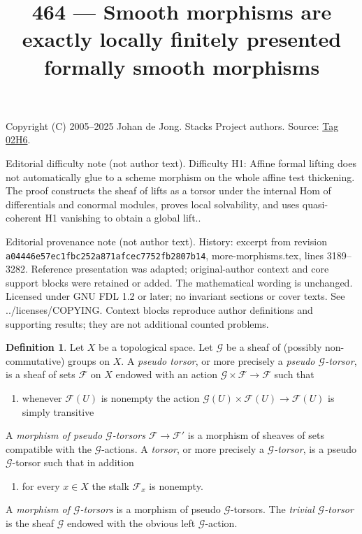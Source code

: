 \documentclass{amsart}
\theoremstyle{plain}
\theoremstyle{definition}
\newtheorem{definition}[subsection]{Definition}
\theoremstyle{remark}
\numberwithin{equation}{subsection}
\begin{document}
\title[Stacks Project, Tag 02H6]{464 --- Smooth morphisms are exactly locally finitely presented formally smooth morphisms}
\maketitle
\noindent Copyright (C) 2005--2025 Johan de Jong. Stacks Project authors. Source: \href{https://stacks.math.columbia.edu/tag/02H6}{Tag 02H6}.

\noindent Editorial difficulty note (not author text). Difficulty H1: Affine formal lifting does not automatically glue to a scheme morphism on the whole affine test thickening. The proof constructs the sheaf of lifts as a torsor under the internal Hom of differentials and conormal modules, proves local solvability, and uses quasi-coherent H1 vanishing to obtain a global lift..

\noindent Editorial provenance note (not author text). History: excerpt from revision \texttt{a0444\allowbreak 6e57e\allowbreak c1fbc\allowbreak 252a8\allowbreak 71afc\allowbreak ec775\allowbreak 2fb28\allowbreak 07b14}, more-morphisms.tex, lines 3189--3282. Reference presentation was adapted; original-author context and core support blocks were retained or added. The mathematical wording is unchanged. Licensed under GNU FDL 1.2 or later; no invariant sections or cover texts. See ../licenses/COPYING. Context blocks reproduce author definitions and supporting results; they are not additional counted problems.

\begin{definition}
\label{cohomology-definition-torsor}
Let $X$ be a topological space.
Let $\mathcal{G}$ be a sheaf of (possibly non-commutative) groups on $X$.
A {\it pseudo torsor}, or more precisely a {\it pseudo $\mathcal{G}$-torsor},
is a sheaf of sets $\mathcal{F}$ on $X$ endowed with an action
$\mathcal{G} \times \mathcal{F} \to \mathcal{F}$ such that
\begin{enumerate}
\item whenever $\mathcal{F}(U)$ is nonempty the action
$\mathcal{G}(U) \times \mathcal{F}(U) \to \mathcal{F}(U)$
is simply transitive
\end{enumerate}
A {\it morphism of pseudo $\mathcal{G}$-torsors} $\mathcal{F} \to \mathcal{F}'$
is a morphism of sheaves of sets compatible with the
$\mathcal{G}$-actions. A {\it torsor}, or more precisely a
{\it $\mathcal{G}$-torsor}, is a pseudo $\mathcal{G}$-torsor such
that in addition
\begin{enumerate}
\item[(2)] for every $x \in X$ the stalk $\mathcal{F}_x$ is nonempty.
\end{enumerate}
A {\it morphism of $\mathcal{G}$-torsors} is a morphism of
pseudo $\mathcal{G}$-torsors. The {\it trivial $\mathcal{G}$-torsor}
is the sheaf $\mathcal{G}$ endowed with the obvious left
$\mathcal{G}$-action.
\end{definition}
\end{document}
